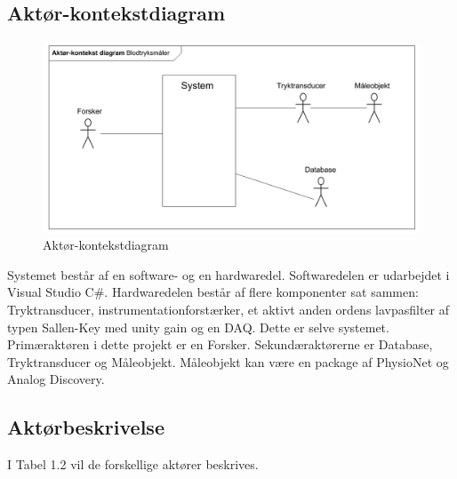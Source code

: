 \subsection{Aktør-kontekstdiagram}
\begin{figure}[H]
	\centering
	\includegraphics[width=1\textwidth]{Figurer/Snip20151104_43}
	\caption{Aktør-kontekstdiagram}
	\label{fig:aktoerbeskrivelse}
\end{figure}

Systemet består af en software- og en hardwaredel. Softwaredelen er udarbejdet i Visual Studio C\#. Hardwaredelen består af flere komponenter sat sammen: Tryktransducer, instrumentationforstærker, et aktivt anden ordens lavpasfilter af typen Sallen-Key med unity gain og en DAQ. Dette er selve systemet. \\
Primæraktøren i dette projekt er en Forsker. Sekundæraktørerne er Database, Tryktransducer og Måleobjekt. Måleobjekt kan være en package af PhysioNet og Analog Discovery. 

\subsection{Aktørbeskrivelse}
I Tabel 1.2 vil de forskellige aktører beskrives. 

